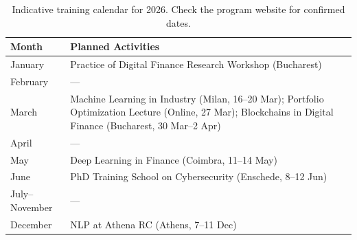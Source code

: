 \begin{table}[h]
\centering
\small
\begin{tabularx}{\textwidth}{@{}l X@{}}
  \toprule
  \textbf{Month} & \textbf{Planned Activities} \\
  \midrule
  January             & Practice of Digital Finance Research Workshop (Bucharest) \\
  February            & --- \\
  March               & Machine Learning in Industry (Milan, 16--20 Mar); Portfolio Optimization Lecture (Online, 27 Mar); Blockchains in Digital Finance (Bucharest, 30 Mar--2 Apr) \\
  April               & --- \\
  May                 & Deep Learning in Finance (Coimbra, 11--14 May) \\
  June                & PhD Training School on Cybersecurity (Enschede, 8--12 Jun) \\
  July--November      & --- \\
  December            & NLP at Athena RC (Athens, 7--11 Dec) \\
  \bottomrule
\end{tabularx}
\caption{Indicative training calendar for 2026.  Check the program website for
confirmed dates.}
\label{tab:calendar-2026}
\end{table}
